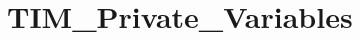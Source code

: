 \hypertarget{group___t_i_m___private___variables}{\section{T\-I\-M\-\_\-\-Private\-\_\-\-Variables}
\label{group___t_i_m___private___variables}
}
